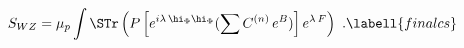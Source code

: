 \begin{equation}
S_{WZ}=\mu_p\int \STr\left(P\left[e^{i\lambda\,\hi_\Phi \hi_\Phi}
( \sum C^{(n)}\,e^B)\right] e^{\lambda\,F}\right)\ .
\labell{finalcs}
\end{equation}


